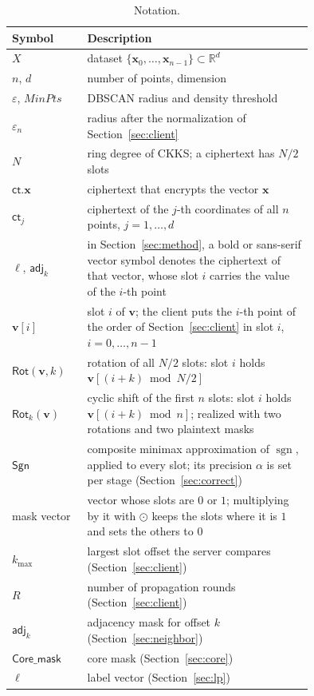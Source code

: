 \begin{table}[t]
\centering
\caption{Notation.}
\label{tab:notation}
\renewcommand{\arraystretch}{1.15}
\begin{tabular}{@{}l p{0.75\linewidth}@{}}
\toprule
Symbol & Description \tabularnewline
\midrule
$X$
  & \raggedright dataset $\{\mathbf{x}_0, \dots, \mathbf{x}_{n-1}\} \subset
    \mathbb{R}^d$ \tabularnewline
$n$, $d$ & \raggedright number of points, dimension \tabularnewline
$\varepsilon$, $\mathit{MinPts}$
  & \raggedright DBSCAN radius and density threshold \tabularnewline
$\varepsilon_n$
  & \raggedright radius after the normalization of
    Section~\ref{sec:client} \tabularnewline
$N$ & \raggedright ring degree of CKKS; a ciphertext has $N/2$ slots
  \tabularnewline
$\mathsf{ct}.\mathbf{x}$
  & \raggedright ciphertext that encrypts the vector $\mathbf{x}$
    \tabularnewline
$\mathsf{ct}_j$
  & \raggedright ciphertext of the $j$-th coordinates of all $n$ points,
    $j = 1, \dots, d$ \tabularnewline
$\boldsymbol{\ell}$, $\mathsf{adj}_k$
  & \raggedright in Section~\ref{sec:method}, a bold or sans-serif vector
    symbol denotes the ciphertext of that vector, whose slot $i$ carries
    the value of the $i$-th point \tabularnewline
$\mathbf{v}[i]$
  & \raggedright slot $i$ of $\mathbf{v}$; the client puts the $i$-th
    point of the order of Section~\ref{sec:client} in slot $i$,
    $i = 0, \dots, n-1$ \tabularnewline
$\mathsf{Rot}(\mathbf{v}, k)$
  & \raggedright rotation of all $N/2$ slots: slot $i$ holds
    $\mathbf{v}[(i+k) \bmod N/2]$ \tabularnewline
$\mathsf{Rot}_k(\mathbf{v})$
  & \raggedright cyclic shift of the first $n$ slots: slot $i$ holds
    $\mathbf{v}[(i+k) \bmod n]$; realized with two rotations and two
    plaintext masks \tabularnewline
$\mathsf{Sgn}$
  & \raggedright composite minimax approximation of $\operatorname{sgn}$,
    applied to every slot; its precision $\alpha$ is set per stage
    (Section~\ref{sec:correct}) \tabularnewline
mask vector
  & \raggedright vector whose slots are $0$ or $1$; multiplying by it
    with $\odot$ keeps the slots where it is $1$ and sets the others to
    $0$ \tabularnewline
$k_{\max}$
  & \raggedright largest slot offset the server compares
    (Section~\ref{sec:client}) \tabularnewline
$R$
  & \raggedright number of propagation rounds (Section~\ref{sec:client})
    \tabularnewline
$\mathsf{adj}_k$
  & \raggedright adjacency mask for offset $k$
    (Section~\ref{sec:neighbor}) \tabularnewline
$\mathsf{Core\_mask}$
  & \raggedright core mask (Section~\ref{sec:core}) \tabularnewline
$\boldsymbol{\ell}$
  & \raggedright label vector (Section~\ref{sec:lp}) \tabularnewline
\bottomrule
\end{tabular}
\end{table}

